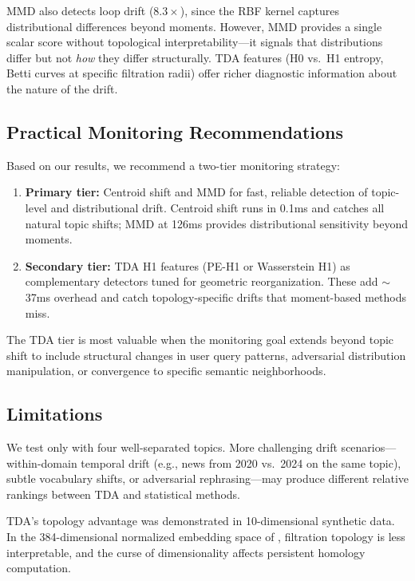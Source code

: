 MMD also detects loop drift ($8.3\times$), since the RBF kernel captures distributional differences beyond moments. However, MMD provides a single scalar score without topological interpretability---it signals that distributions differ but not \emph{how} they differ structurally. TDA features (H0 vs.\ H1 entropy, Betti curves at specific filtration radii) offer richer diagnostic information about the nature of the drift.

\subsection{Practical Monitoring Recommendations}

Based on our results, we recommend a two-tier monitoring strategy:

\begin{enumerate}[leftmargin=*,itemsep=2pt,topsep=2pt]
    \item \textbf{Primary tier:} Centroid shift and MMD for fast, reliable detection of topic-level and distributional drift. Centroid shift runs in 0.1ms and catches all natural topic shifts; MMD at 126ms provides distributional sensitivity beyond moments.
    \item \textbf{Secondary tier:} TDA H1 features (PE-H1 or Wasserstein H1) as complementary detectors tuned for geometric reorganization. These add $\sim$37ms overhead and catch topology-specific drifts that moment-based methods miss.
\end{enumerate}

The TDA tier is most valuable when the monitoring goal extends beyond topic shift to include structural changes in user query patterns, adversarial distribution manipulation, or convergence to specific semantic neighborhoods.

\subsection{Limitations}
\label{sec:limitations}

We test only \agnews with four well-separated topics. More challenging drift scenarios---within-domain temporal drift (e.g., news from 2020 vs.\ 2024 on the same topic), subtle vocabulary shifts, or adversarial rephrasing---may produce different relative rankings between TDA and statistical methods.

TDA's topology advantage was demonstrated in 10-dimensional synthetic data. In the 384-dimensional normalized embedding space of \minilm, \vrfilt filtration topology is less interpretable, and the curse of dimensionality affects persistent homology computation.

